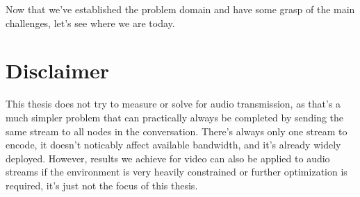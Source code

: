 Now that we've established the problem domain and have some grasp of the main challenges, let's see where we are today.


\section{Disclaimer}

This thesis does not try to measure or solve for audio transmission, as that's a much simpler problem that can practically always be completed by sending the same stream to all nodes in the conversation. There's always only one stream to encode, it doesn't noticably affect available bandwidth, and it's already widely deployed. However, results we achieve for video can also be applied to audio streams if the environment is very heavily constrained or further optimization is required, it's just not the focus of this thesis.
